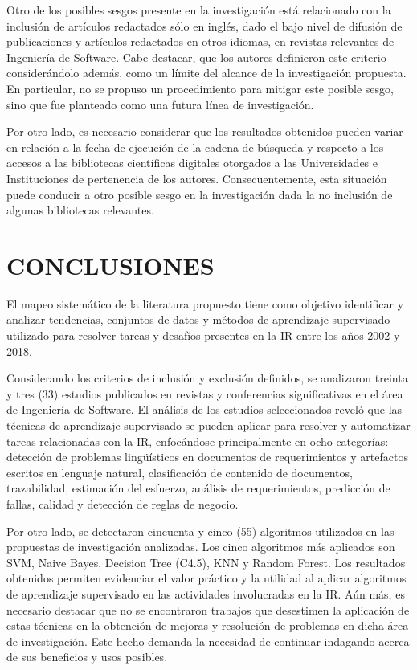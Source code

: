 \documentclass[journal]{IEEEtran}
\begin{document}
Otro de los posibles sesgos presente en la investigación está relacionado con la inclusión de artículos redactados sólo en inglés, dado el bajo nivel de difusión de publicaciones y artículos redactados en otros idiomas, en revistas relevantes de Ingeniería de Software. Cabe destacar, que los autores definieron este criterio considerándolo además, como un límite del alcance de la investigación propuesta. En particular, no se propuso un procedimiento para mitigar este posible sesgo, sino que fue  planteado como una futura línea de investigación.  

Por otro lado, es necesario considerar que los resultados obtenidos pueden variar en relación a la fecha de ejecución de la cadena de búsqueda y respecto a los accesos a las bibliotecas científicas digitales otorgados a las Universidades e Instituciones de pertenencia de los autores. Consecuentemente, esta situación puede conducir a otro posible sesgo en la investigación dada la no inclusión de algunas bibliotecas relevantes.


\section{CONCLUSIONES}

El mapeo sistemático de la literatura propuesto tiene como objetivo identificar y analizar tendencias, conjuntos de datos y métodos de aprendizaje supervisado utilizado para resolver tareas y desafíos presentes en la IR entre los años 2002 y 2018.

Considerando los criterios de inclusión y exclusión definidos, se analizaron treinta y tres (33) estudios publicados en revistas y conferencias significativas en el área de Ingeniería de Software. El análisis de los estudios seleccionados reveló que las técnicas de aprendizaje supervisado se pueden aplicar para resolver y automatizar tareas relacionadas con la IR, enfocándose principalmente en ocho categorías: detección de problemas lingüísticos en documentos de requerimientos y artefactos escritos en lenguaje natural, clasificación de contenido de documentos, trazabilidad, estimación del esfuerzo, análisis de requerimientos, predicción de fallas, calidad y detección de reglas de negocio. 

Por otro lado, se detectaron cincuenta y cinco (55) algoritmos utilizados en las propuestas de investigación analizadas. Los cinco algoritmos más aplicados son SVM, Naive Bayes, Decision Tree (C4.5), KNN y Random Forest.
Los resultados obtenidos permiten evidenciar el valor práctico y la utilidad al aplicar algoritmos de aprendizaje supervisado en las actividades involucradas en la IR. Aún más, es necesario destacar que no se encontraron trabajos que desestimen la aplicación de estas técnicas en la obtención de mejoras y resolución de problemas en dicha área de investigación. Este hecho demanda la necesidad de continuar indagando acerca de sus beneficios y usos posibles.
\end{document}
